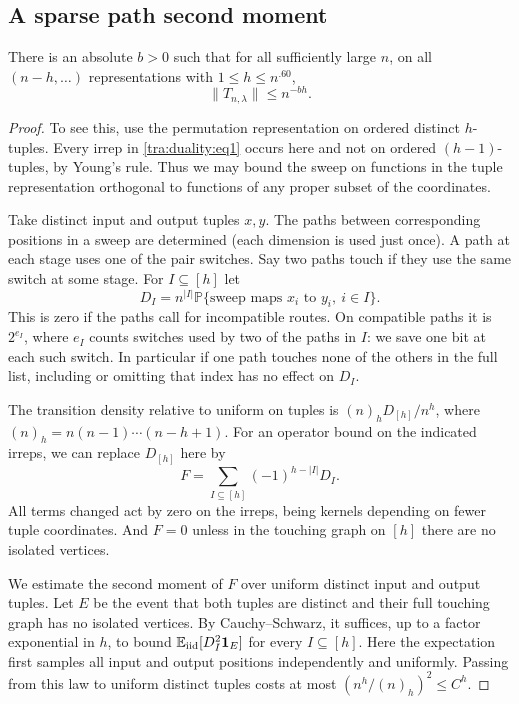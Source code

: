 \subsection{A sparse path second moment}
\begin{lemma}\label{tra:duality:sparse}
\label{tra:duality:sparse-statement}
There is an absolute \(b>0\) such that for all sufficiently large \(n\), on all \((n-h,\ldots)\) representations with
\(1\le h\le n^{.60}\),
\begin{equation}
                             \|T_{n,\lambda}\|\le n^{-bh}.       \label{tra:duality:eq1}
\end{equation}
\end{lemma}
\begin{proof}\label{tra:duality:sparse-proof}
\label{tra:duality:sparse-second-moment}
To see this, use the permutation representation on ordered distinct \(h\)-tuples. Every irrep in \eqref{tra:duality:eq1} occurs here and not on ordered \((h-1)\)-tuples, by Young's rule. Thus we may bound the sweep on functions in the tuple representation orthogonal to functions of any proper subset of the coordinates.

Take distinct input and output tuples \(x,y\). The paths between corresponding positions in a sweep are determined (each dimension is used just once). A path at each stage uses one of the pair switches. Say two paths touch if they use the same switch at some stage. For \(I\subseteq [h]\) let
\[
   D_I=n^{|I|}\mathbb P\{\text{sweep maps }x_i\text{ to }y_i,\ i\in I\}.
\]
This is zero if the paths call for incompatible routes. On compatible paths it is \(2^{e_I}\), where \(e_I\) counts switches used by two of the paths in \(I\): we save one bit at each such switch. In particular if one path touches none of the others in the full list, including or omitting that index has no effect on \(D_I\).

The transition density relative to uniform on tuples is \((n)_h D_{[h]}/n^h\), where \((n)_h=n(n-1)\cdots(n-h+1)\). For an operator bound on the indicated irreps, we can replace \(D_{[h]}\) here by
\[
                F=\sum_{I\subseteq[h]}(-1)^{h-|I|}D_I.
\]
All terms changed act by zero on the irreps, being kernels depending on fewer tuple coordinates. And \(F=0\) unless in the touching graph on \([h]\) there are no isolated vertices.

We estimate the second moment of $F$ over uniform distinct input and output
tuples. Let $E$ be the event that both tuples are distinct and their full
touching graph has no isolated vertices. By Cauchy--Schwarz, it suffices,
up to a factor exponential in $h$, to bound
$\mathbb E_{\rm iid}[D_I^2\mathbf1_E]$ for every $I\subseteq[h]$.
Here the expectation first samples all input and output positions
independently and uniformly. Passing from this law to uniform distinct
tuples costs at most $(n^h/(n)_h)^2\le C^h$.


\end{proof}

